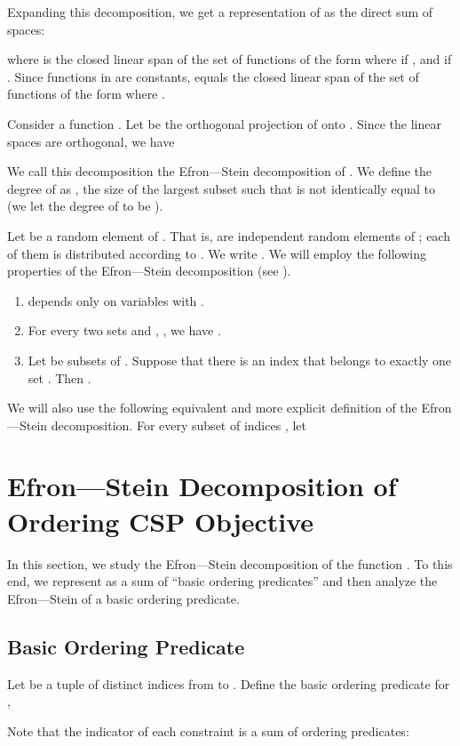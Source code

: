 \documentclass[11pt]{article}
\begin{document}
Expanding this decomposition, we get a representation of  as the direct sum of  spaces:

where  is the closed linear span of the set of functions of the form  where  if , and  if .
Since functions in  are constants,  equals the closed linear span of the set of functions of the form  where
.

Consider a function . Let  be the orthogonal projection of  onto .
Since the linear spaces  are orthogonal, we have

We call this decomposition the Efron---Stein decomposition of . We define the degree of  as ,
the size of the largest subset  such that   is not identically equal to  (we let the degree of  to be ).

Let  be a random element of . That is,  are  independent random elements of ; each of them is distributed according to . We write .
We will employ the following properties of the Efron---Stein decomposition (see \cite[Section 8.3]{ODonnell}).
\begin{enumerate}
\item  depends only on variables  with .
\item For every two sets  and , , we have .
\item Let  be subsets of . Suppose that there is an index  that belongs to exactly
one set . Then .
\end{enumerate}

We will also use the following equivalent and more explicit definition of the Efron---Stein decomposition.
For every subset  of indices , let


\section{Efron---Stein Decomposition of Ordering CSP Objective}\label{sec:ES-ordering-CSP}
In this section, we study the Efron---Stein
decomposition of the function .
To this end, we represent  as a sum of
``basic ordering predicates'' and then analyze the Efron---Stein of a basic ordering predicate.

\subsection{Basic Ordering Predicate}\label{subsec:bop}
Let  be a tuple of distinct
indices from  to .
Define the basic ordering predicate  for ,

Note that the indicator of each constraint
 is a sum of ordering predicates:
\end{document}
